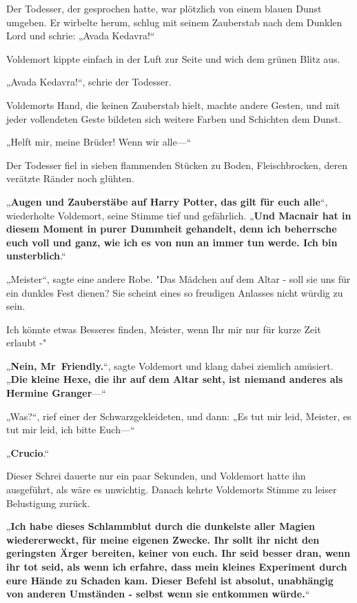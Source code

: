 {Der Todesser, der gesprochen hatte, war plötzlich von einem blauen Dunst umgeben. Er wirbelte herum, schlug mit seinem Zauberstab nach dem Dunklen Lord und schrie: „Avada Kedavra!“

Voldemort kippte einfach in der Luft zur Seite und wich dem grünen Blitz aus.

„Avada Kedavra!“, schrie der Todesser.

Voldemorts Hand, die keinen Zauberstab hielt, machte andere Gesten, und mit jeder vollendeten Geste bildeten sich weitere Farben und Schichten dem Dunst.

„Helft mir, meine Brüder! Wenn wir alle—“

Der Todesser fiel in sieben flammenden Stücken zu Boden, Fleischbrocken, deren verätzte Ränder noch glühten.

„\textbf{Augen und Zauberstäbe auf Harry Potter, das gilt für euch alle}“, wiederholte Voldemort, seine Stimme tief und gefährlich. „\textbf{Und Macnair hat in diesem Moment in purer Dummheit gehandelt, denn ich beherrsche euch voll und ganz, wie ich es von nun an immer tun werde. Ich bin unsterblich}.“

„Meister“, sagte eine andere Robe. "Das Mädchen auf dem Altar - soll sie uns für ein dunkles Fest dienen? Sie scheint eines so freudigen Anlasses nicht würdig zu sein.

Ich könnte etwas Besseres finden, Meister, wenn Ihr mir nur für kurze Zeit erlaubt -"

„\textbf{Nein, Mr~Friendly.}“, sagte Voldemort und klang dabei ziemlich amüsiert. „\textbf{Die kleine Hexe, die ihr auf dem Altar seht, ist niemand anderes als Hermine Granger}—“

„Was?“, rief einer der Schwarzgekleideten, und dann: „Es tut mir leid, Meister, es tut mir leid, ich bitte Euch—“

„\textbf{Crucio}.“

Dieser Schrei dauerte nur ein paar Sekunden, und Voldemort hatte ihn ausgeführt, als wäre es unwichtig. Danach kehrte Voldemorts Stimme zu leiser Belustigung zurück.

„\textbf{Ich habe dieses Schlammblut durch die dunkelste aller Magien wiedererweckt, für meine eigenen Zwecke. Ihr sollt ihr nicht den geringsten Ärger bereiten, keiner von euch. Ihr seid besser dran, wenn ihr tot seid, als wenn ich erfahre, dass mein kleines Experiment durch eure Hände zu Schaden kam. Dieser Befehl ist absolut, unabhängig von anderen Umständen - selbst wenn sie entkommen würde.}“

}

